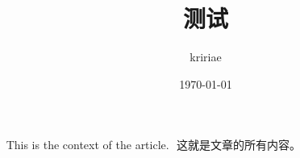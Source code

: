 \documentclass[UTF8]{ctexart}
\title{测试}
\author{kririae}
\date{\today}
\begin{document}
\maketitle
​
This is the context of the article.
​
这就是文章的所有内容。
​\newline
\end{document}
